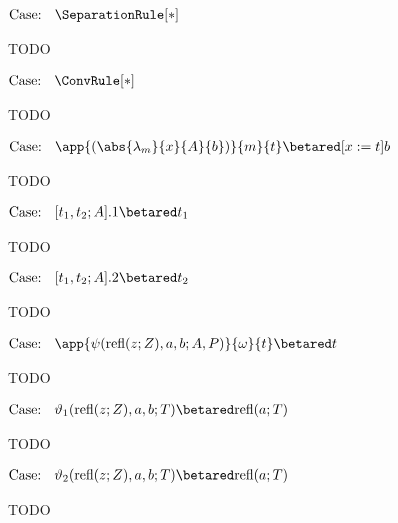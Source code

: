 $\text{Case: }\begin{array}{c} \SeparationRule[*] \end{array}$
\begin{proofcase}
    TODO
\end{proofcase}

$\text{Case: }\begin{array}{c} \ConvRule[*] \end{array}$
\begin{proofcase}
    TODO
\end{proofcase}



$\text{Case: }\begin{array}{c} \app{(\abs{\lambda_m}{x}{A}{b})}{m}{t} \betared [x := t]b \end{array}$
\begin{proofcase}
    TODO
\end{proofcase}

$\text{Case: }\begin{array}{c} [t_1, t_2; A].1 \betared t_1 \end{array}$
\begin{proofcase}
    TODO
\end{proofcase}

$\text{Case: }\begin{array}{c} [t_1, t_2; A].2 \betared t_2 \end{array}$
\begin{proofcase}
    TODO
\end{proofcase}

$\text{Case: }\begin{array}{c} \app{\psi(\text{refl}(z; Z), a, b; A, P)}{\omega}{t} \betared t \end{array}$
\begin{proofcase}
    TODO
\end{proofcase}

$\text{Case: }\begin{array}{c} \vartheta_1(\text{refl}(z; Z), a, b; T) \betared \text{refl}(a; T) \end{array}$
\begin{proofcase}
    TODO
\end{proofcase}

$\text{Case: }\begin{array}{c} \vartheta_2(\text{refl}(z; Z), a, b; T) \betared \text{refl}(a; T) \end{array}$
\begin{proofcase}
    TODO
\end{proofcase}

